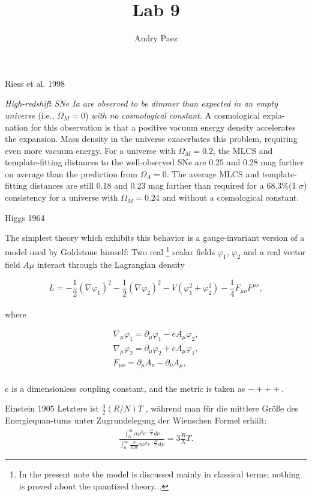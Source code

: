 \documentclass{article}
\begin{document}
\title{\textbf{Lab 9}}
\author{Andry Paez}
\date{}
\maketitle

\begin{section}{Riess et al. 1998}   

\textit{High-redshift SNe Ia are observed to be dimmer than expected in an empty
universe} (i.e., $\Omega_M = 0$) \textit{with no cosmological constant.} A cosmological expla-
nation for this observation is that a positive vacuum energy density accelerates
the expansion. Mass density in the universe exacerbates this problem, requiring
even more vacuum energy. For a universe with $\Omega_M = 0.2$, the MLCS and
template-ﬁtting distances to the well-observed SNe are 0.25 and 0.28 mag farther
on average than the prediction from $\Omega_\Lambda = 0$. The average MLCS and template-ﬁtting distances are still 0.18 and 0.23 mag farther than required for a 68.3\%(1 $\sigma$)
consistency for a universe with $\Omega_M = 0.24$ and without a cosmological constant.
\end{section}
\newpage
\begin{section}{Higgs 1964}   

The simplest theory which exhibits this behavior is a gauge-invariant version
of a model used by Goldstone himself: Two real \footnote{In the present note the model is discussed mainly in classical terms; nothing is proved
about the quantized theory...} scalar ﬁelds $\varphi_1$, $\varphi_2$ and a real
vector ﬁeld $A\mu$ interact through the Lagrangian density

\begin{equation}
    L = -\frac 1 2 (\nabla\varphi_1)^2 - \frac 1 2 (\nabla\varphi_2)^2 - V(\varphi_1^2 + \varphi_2^2) - \frac 1 4 F_{\mu\nu}F^{\mu\nu}, \tag{12.1}
\end{equation}
\\
where 

\begin{align*}
   \nabla_\mu\varphi_1 = \partial_\mu\varphi_1 - eA_\mu\varphi_2,
    \\
   \nabla_\mu\varphi_2 = \partial_\mu\varphi_2 + eA_\mu\varphi_1,
   \\
   F_{\mu\nu} = \partial_\mu A_\nu - \partial_\nu A_\mu,
\end{align*}
\\
$e$ is a dimensionless coupling constant, and the metric is taken as $- + + +$.

\end{section}
\newpage
\begin{section}{Einstein 1905}   
Letztere ist $\frac 3 2 (R/N )T$ , w\"{a}hrend man f\"{u}r die mittlere Gr\"{o}\ss e des Energiequan-tums unter Zugrundelegung der Wienschen Formel erh\"{a}lt:
\begin{align*}
\frac{\displaystyle\int_0^{\infty}\alpha\nu^3 e^{-\displaystyle\frac{\beta\nu}{T}}d\nu}{\displaystyle\int_0^{\infty}\frac N {R\beta\nu}\alpha\nu^3 e^{-\displaystyle\frac{\beta\nu}{T}}d\nu} = 3 \displaystyle\frac R N T\text{.}
\end{align*}
\end{section}
\end{document}
